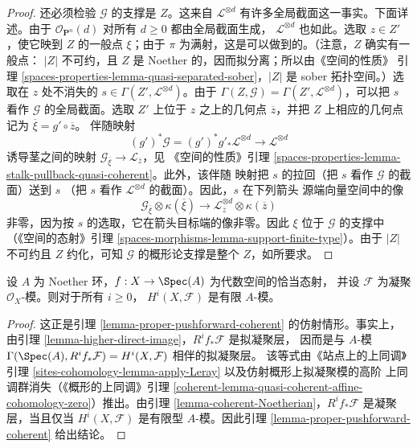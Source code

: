 \begin{proof}
\medskip\noindent
还必须检验 $\mathcal{G}$ 的支撑是 $Z$。这来自
$\mathcal{L}^{\otimes d}$ 有许多全局截面这一事实。下面详述。由于
$\mathcal{O}_{\mathbf{P}^n}(d)$ 对所有 $d \geq 0$ 都由全局截面生成，
$\mathcal{L}^{\otimes d}$ 也如此。选取 $z \in Z'$，使它映到 $Z$ 的一般点
$\xi$；由于 $\pi$ 为满射，这是可以做到的。（注意，$Z$ 确实有一般点：
$|Z|$ 不可约，且 $Z$ 是 Noether 的，因而拟分离；所以由《空间的性质》
引理 \ref{spaces-properties-lemma-quasi-separated-sober}，$|Z|$ 是 sober
拓扑空间。）选取在 $z$ 处不消失的
$s \in \Gamma(Z', \mathcal{L}^{\otimes d})$。由于
$\Gamma(Z, \mathcal{G}) = \Gamma(Z', \mathcal{L}^{\otimes d})$，可以把
$s$ 看作 $\mathcal{G}$ 的全局截面。选取 $Z'$ 上位于 $z$ 之上的几何点
$\overline{z}$，并把 $Z$ 上相应的几何点记为
$\overline{\xi} = g' \circ \overline{z}$。%
伴随映射
$$
(g')^*\mathcal{G} =
(g')^*g'_*\mathcal{L}^{\otimes d} \longrightarrow \mathcal{L}^{\otimes d}
$$
诱导茎之间的映射
$\mathcal{G}_{\overline{\xi}} \to \mathcal{L}_{\overline{z}}$，见
《空间的性质》引理
\ref{spaces-properties-lemma-stalk-pullback-quasi-coherent}。此外，该伴随
映射把 $s$ 的拉回（把 $s$ 看作 $\mathcal{G}$ 的截面）送到 $s$
（把 $s$ 看作 $\mathcal{L}^{\otimes d}$ 的截面）。因此，$s$ 在下列箭头
源端向量空间中的像
$$
\mathcal{G}_{\overline{\xi}} \otimes \kappa(\overline{\xi})
\longrightarrow
\mathcal{L}^{\otimes d}_{\overline{z}} \otimes \kappa(\overline{z})
$$
非零，因为按 $s$ 的选取，它在箭头目标端的像非零。因此 $\xi$ 位于
$\mathcal{G}$ 的支撑中（《空间的态射》引理
\ref{spaces-morphisms-lemma-support-finite-type}）。由于 $|Z|$ 不可约且
$Z$ 约化，可知 $\mathcal{G}$ 的概形论支撑是整个 $Z$，如所要求。
\end{proof}

\begin{lemma}
\label{lemma-proper-over-affine-cohomology-finite}
设 $A$ 为 Noether 环，$f : X \to \Spec(A)$ 为代数空间的恰当态射，
并设 $\mathcal{F}$ 为凝聚 $\mathcal{O}_X$-模。则对于所有 $i \geq 0$，
$H^i(X, \mathcal{F})$ 是有限 $A$-模。
\end{lemma}

\begin{proof}
这正是引理 \ref{lemma-proper-pushforward-coherent} 的仿射情形。事实上，
由引理 \ref{lemma-higher-direct-image}，$R^if_*\mathcal{F}$ 是拟凝聚层，
因而是与 $A$-模
$\Gamma(\Spec(A), R^if_*\mathcal{F}) = H^i(X, \mathcal{F})$ 相伴的拟凝聚层。
该等式由《站点上的上同调》引理
\ref{sites-cohomology-lemma-apply-Leray} 以及仿射概形上拟凝聚模的高阶
上同调群消失（《概形的上同调》引理
\ref{coherent-lemma-quasi-coherent-affine-cohomology-zero}）推出。由引理
\ref{lemma-coherent-Noetherian}，$R^if_*\mathcal{F}$ 是凝聚层，当且仅当
$H^i(X, \mathcal{F})$ 是有限型 $A$-模。因此引理
\ref{lemma-proper-pushforward-coherent} 给出结论。
\end{proof}

